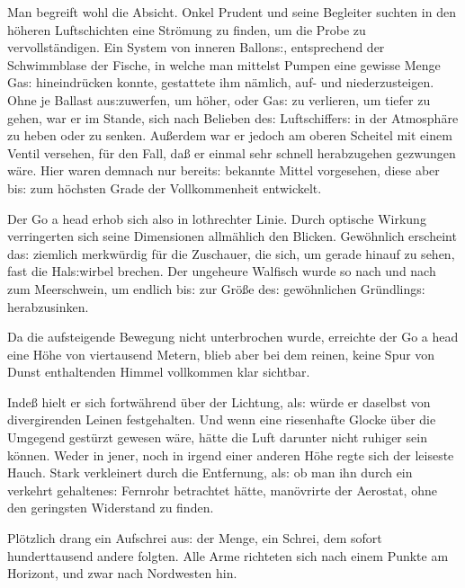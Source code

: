 \documentclass[oneside,12pt]{book}
\newenvironment{antiqua}{\normalfont}{}
\newcommand{\s}{s:}
\begin{document}
Man begreift wohl die Absicht. Onkel Prudent und seine Begleiter
suchten in den h\"oheren Luftschichten eine Str\"omung zu finden, um
die Probe zu vervollst\"andigen. Ein System von inneren Ballon{\s},
entsprechend der Schwimmblase der Fische, in welche man mittelst
Pumpen eine gewisse Menge Ga{\s} hineindr\"ucken konnte, gestattete
ihm n\"amlich, auf- und niederzusteigen. Ohne je Ballast
au{\s}zuwerfen, um h\"oher, oder Ga{\s} zu verlieren, um tiefer zu
gehen, war er im Stande, sich nach Belieben de{\s} Luftschiffer{\s}
in der Atmosph\"are zu heben oder zu senken. Au{\ss}erdem war er
jedoch am oberen Scheitel mit einem Ventil versehen, f\"ur den Fall,
da{\ss} er einmal sehr schnell herabzugehen gezwungen w\"are. Hier
waren demnach nur bereit{\s} bekannte Mittel vorgesehen, diese aber
bi{\s} zum h\"ochsten Grade der Vollkommenheit entwickelt.

Der \begin{antiqua}Go a head\end{antiqua} erhob sich also in
lothrechter Linie. Durch optische Wirkung verringerten sich seine
Dimensionen allm\"ahlich den Blicken. Gew\"ohnlich erscheint da{\s}
ziemlich merkw\"urdig f\"ur die Zuschauer, die sich, um gerade hinauf
zu sehen, fast die Hal{\s}wirbel brechen. Der ungeheure Walfisch
wurde so nach und nach zum Meerschwein, um endlich bi{\s} zur
Gr\"o{\ss}e de{\s} gew\"ohnlichen Gr\"undling{\s} herabzusinken.

Da die aufsteigende Bewegung nicht unterbrochen wurde, erreichte der
\begin{antiqua}Go a head\end{antiqua} eine H\"ohe von viertausend
Metern, blieb aber bei dem reinen, keine Spur von Dunst enthaltenden
Himmel vollkommen klar sichtbar.

Inde{\ss} hielt er sich fortw\"ahrend \"uber der Lichtung, al{\s}
w\"urde er daselbst von divergirenden Leinen festgehalten. Und wenn
eine riesenhafte Glocke \"uber die Umgegend gest\"urzt gewesen
w\"are, h\"atte die Luft darunter nicht ruhiger sein k\"onnen. Weder
in jener, noch in irgend einer anderen H\"ohe regte sich der leiseste
Hauch. Stark verkleinert durch die Entfernung, al{\s} ob man ihn
durch ein verkehrt gehaltene{\s} Fernrohr betrachtet h\"atte,
man\"ovrirte der Aerostat, ohne den geringsten Widerstand zu finden.

Pl\"otzlich drang ein Aufschrei au{\s} der Menge, ein Schrei, dem
sofort hunderttausend andere folgten. Alle Arme richteten sich nach
einem Punkte am Horizont, und zwar nach Nordwesten hin.
\end{document}
